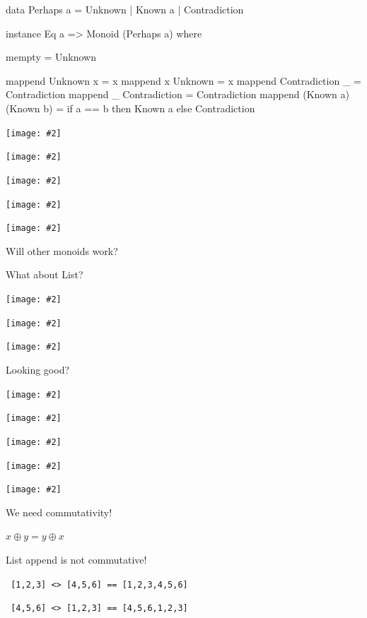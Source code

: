 \documentclass[usenames,dvipsnames,svgnames,table,aspectratio=1610,mathserif]{beamer}
\newcommand{\nl}{\vspace{\baselineskip}}
\newcommand{\pnl}{\pause \nl}
\newcommand{\textslide}[1]{{
\begin{frame}
\begin{center}

#1

\end{center}
\end{frame}
}}
\newcommand{\imageslide}[2][1]{{
\begin{frame}\begin{center}
\texttt{[image: \#2]}
\end{center}\end{frame}
}}
\newcommand{\imageslideleft}[2][1]{{
\begin{frame}
\texttt{[image: \#2]}
\end{frame}
}}
\begin{document}

\begin{frame}[fragile]

\begin{haskellcode}
data Perhaps a = Unknown | Known a | Contradiction
\end{haskellcode}

\pnl

\begin{haskellcode}
instance Eq a => Monoid (Perhaps a) where

  mempty = Unknown

  mappend Unknown x           = x
  mappend x       Unknown     = x
  mappend Contradiction _     = Contradiction
  mappend _     Contradiction = Contradiction
  mappend (Known a) (Known b) =
    if a == b
      then Known a
      else Contradiction
\end{haskellcode}

\end{frame}



\imageslide[0.6]{diagrams/doubleplus4.pdf}
\imageslide[0.6]{diagrams/doubleplus5.pdf}
\imageslide[0.6]{diagrams/doubleplus6.pdf}
\imageslide[0.6]{diagrams/doubleplus7.pdf}
\imageslide[0.6]{diagrams/doubleplus8.pdf}

\textslide{
\LARGE{Will other monoids work?}

\pnl

\Large{What about List?}
}

\imageslide[0.6]{diagrams/doubleplus9.pdf}
\imageslide[0.6]{diagrams/doubleplus10.pdf}
\imageslide[0.6]{diagrams/doubleplus11.pdf}
\textslide{\Large{Looking good?}}
\imageslide[0.6]{diagrams/doubleplus12.pdf}
\imageslide[0.6]{diagrams/doubleplus13.pdf}
\imageslide[0.6]{diagrams/doubleplus14.pdf}
\imageslide[0.6]{diagrams/doubleplus11.pdf}
\imageslide[0.6]{diagrams/doubleplus14.pdf}


\begin{frame}[fragile]
\begin{center}
\Large{
  We need commutativity!

  \nl

  $x \oplus y = y \oplus x$

  \pnl

  List append is not commutative!

  {\tt {
    [1,2,3] <> [4,5,6] == [1,2,3,4,5,6]
  }}

  {\tt {
    [4,5,6] <> [1,2,3] == [4,5,6,1,2,3]
  }}
}
\end{center}
\end{frame}
\end{document}
